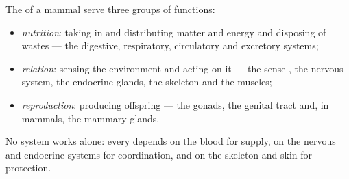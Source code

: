 \begin{proposition}\label{prop:b1:mammal-organization:functions}
The  of a mammal serve three groups of functions:
\begin{itemize}
  \item \emph{nutrition}: taking in and
        distributing matter and energy and disposing of wastes ---
        the digestive, respiratory, circulatory and excretory systems;
  \item \emph{relation}: sensing the
        environment and acting on it --- the sense , the nervous
        system, the endocrine glands, the skeleton and the muscles;
  \item \emph{reproduction}: producing
        offspring --- the gonads, the genital tract and, in mammals,
        the mammary glands.
\end{itemize}
No system works alone: every  depends on the blood for supply,
on the nervous and endocrine systems for coordination, and on the
skeleton and skin for protection.
\end{proposition}

